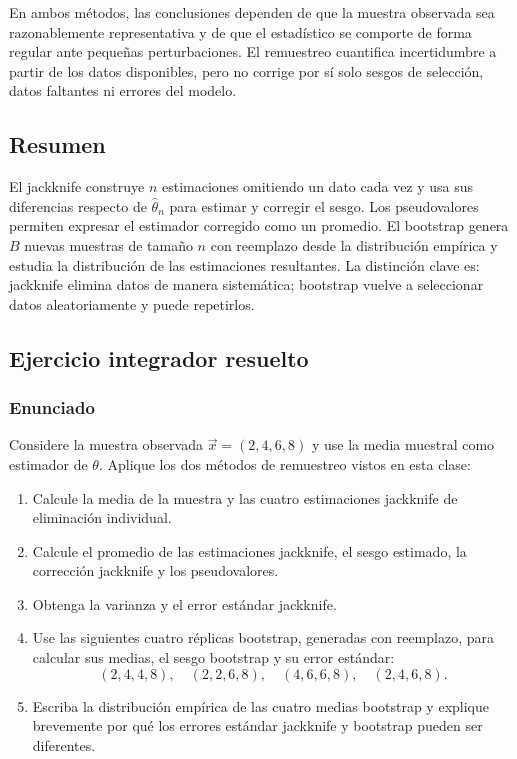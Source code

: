 En ambos métodos, las conclusiones dependen de que la muestra observada sea
razonablemente representativa y de que el estadístico se comporte de forma
regular ante pequeñas perturbaciones. El remuestreo cuantifica incertidumbre
a partir de los datos disponibles, pero no corrige por sí solo sesgos de
selección, datos faltantes ni errores del modelo.

\subsection{Resumen}

El jackknife construye $n$ estimaciones omitiendo un dato cada vez y usa sus
diferencias respecto de $\widehat\theta_n$ para estimar y corregir el sesgo.
Los pseudovalores permiten expresar el estimador corregido como un promedio.
El bootstrap genera $B$ nuevas muestras de tamaño $n$ con reemplazo desde la
distribución empírica y estudia la distribución de las estimaciones
resultantes. La distinción clave es: jackknife elimina datos de manera
sistemática; bootstrap vuelve a seleccionar datos aleatoriamente y puede
repetirlos.

\subsection{Ejercicio integrador resuelto}

\subsubsection*{Enunciado}

Considere la muestra observada $\vec{x}=(2,4,6,8)$ y use la media muestral
como estimador de $\theta$. Aplique los dos métodos de remuestreo vistos en
esta clase:
\begin{enumerate}
    \item Calcule la media de la muestra y las cuatro estimaciones jackknife
    de eliminación individual.
    \item Calcule el promedio de las estimaciones jackknife, el sesgo
    estimado, la corrección jackknife y los pseudovalores.
    \item Obtenga la varianza y el error estándar jackknife.
    \item Use las siguientes cuatro réplicas bootstrap, generadas con
    reemplazo, para calcular sus medias, el sesgo bootstrap y su error
    estándar:
    \[
        (2,4,4,8),\quad (2,2,6,8),\quad (4,6,6,8),\quad (2,4,6,8).
    \]
    \item Escriba la distribución empírica de las cuatro medias bootstrap y
    explique brevemente por qué los errores estándar jackknife y bootstrap
    pueden ser diferentes.
\end{enumerate}

